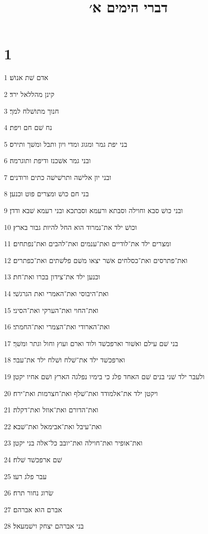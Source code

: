 

\title{דברי הימים א׳}


\chapter{1}

\par 1 אדם שׁת אנושׁ׃
\par 2 קינן מהללאל ירד׃
\par 3 חנוך מתושׁלח למך׃
\par 4 נח שׁם חם ויפת׃
\par 5 בני יפת גמר ומגוג ומדי ויון ותבל ומשׁך ותירס׃
\par 6 ובני גמר אשׁכנז ודיפת ותוגרמה׃
\par 7 ובני יון אלישׁה ותרשׁישׁה כתים ורודנים׃
\par 8 בני חם כושׁ ומצרים פוט וכנען׃
\par 9 ובני כושׁ סבא וחוילה וסבתא ורעמא וסבתכא ובני רעמא שׁבא ודדן׃
\par 10 וכושׁ ילד את־נמרוד הוא החל להיות גבור בארץ׃
\par 11 ומצרים ילד את־לודיים ואת־ענמים ואת־להבים ואת־נפתחים׃
\par 12 ואת־פתרסים ואת־כסלחים אשׁר יצאו משׁם פלשׁתים ואת־כפתרים׃
\par 13 וכנען ילד את־צידון בכרו ואת־חת׃
\par 14 ואת־היבוסי ואת־האמרי ואת הגרגשׁי׃
\par 15 ואת־החוי ואת־הערקי ואת־הסיני׃
\par 16 ואת־הארודי ואת־הצמרי ואת־החמתי׃
\par 17 בני שׁם עילם ואשׁור וארפכשׁד ולוד וארם ועוץ וחול וגתר ומשׁך׃
\par 18 וארפכשׁד ילד את־שׁלח ושׁלח ילד את־עבר׃
\par 19 ולעבר ילד שׁני בנים שׁם האחד פלג כי בימיו נפלגה הארץ ושׁם אחיו יקטן׃
\par 20 ויקטן ילד את־אלמודד ואת־שׁלף ואת־חצרמות ואת־ירח׃
\par 21 ואת־הדורם ואת־אוזל ואת־דקלה׃
\par 22 ואת־עיבל ואת־אבימאל ואת־שׁבא׃
\par 23 ואת־אופיר ואת־חוילה ואת־יובב כל־אלה בני יקטן׃
\par 24 שׁם ארפכשׁד שׁלח׃
\par 25 עבר פלג רעו׃
\par 26 שׂרוג נחור תרח׃
\par 27 אברם הוא אברהם׃
\par 28 בני אברהם יצחק וישׁמעאל׃
